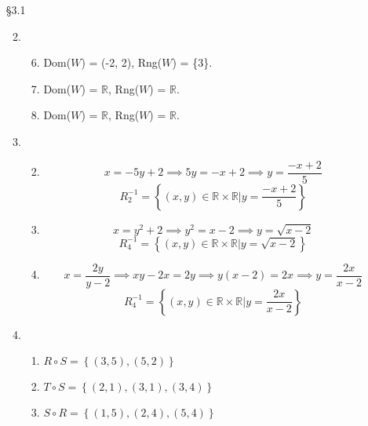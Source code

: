 \documentclass[12pt,letterpaper]{article}
\newcommand*\PCI{%
  Principle of Complete Induction%
}
\begin{document}
\begin{enumerate}
\begin{enumerate}
\begin{enumerate}
\begin{proof}
                Thus by the \PCI, $S = \mathbb{N}$.
              \end{proof}
          \end{enumerate}
      \end{enumerate}
    \item [\S 3.1]
      \begin{enumerate}
        \setcounter{enumii}{1}
        \item
          \begin{enumerate}
            \setcounter{enumiii}{5}
            \item Dom($W$) = (-2, 2), Rng($W$) = \{3\}.
            \item Dom($W$) = $\mathbb{R}$, Rng($W$) = $\mathbb{R}$.
            \item Dom($W$) = $\mathbb{R}$, Rng($W$) = $\mathbb{R}$.
          \end{enumerate}
        \setcounter{enumii}{3}
        \item
          \begin{enumerate}
            \setcounter{enumiii}{1}
            \item
              \[x = -5y + 2 \implies 5y = -x + 2 \implies y = \frac{-x + 2}{5}\]
              \[R_2^{-1} = \left\{(x, y) \in \mathbb{R} \times \mathbb{R} | y = \frac{-x + 2}{5}\right\}\]
            \setcounter{enumiii}{3}
            \item
              \[x = y^2 + 2 \implies y^2 = x - 2 \implies y = \sqrt{x - 2}\]
              \[R_4^{-1} = \left\{(x, y) \in \mathbb{R} \times \mathbb{R} | y = \sqrt{x - 2}\right\}\]
            \setcounter{enumiii}{7}
            \item
              \[x = \frac{2y}{y - 2} \implies xy - 2x = 2y \implies y(x - 2) = 2x \implies y = \frac{2x}{x - 2}\]
              \[R_4^{-1} = \left\{(x, y) \in \mathbb{R} \times \mathbb{R} | y = \frac{2x}{x - 2}\right\}\]
          \end{enumerate}
        \item
          \begin{enumerate}
            \item $R \circ S = \left\{(3, 5), (5, 2)\right\}$
            \setcounter{enumiii}{2}
            \item $T \circ S = \left\{(2, 1), (3, 1), (3, 4)\right\}$
            \setcounter{enumiii}{4}
            \item $S \circ R = \left\{(1, 5), (2, 4), (5, 4)\right\}$
          \end{enumerate}

\end{enumerate}
\end{enumerate}
\end{document}
